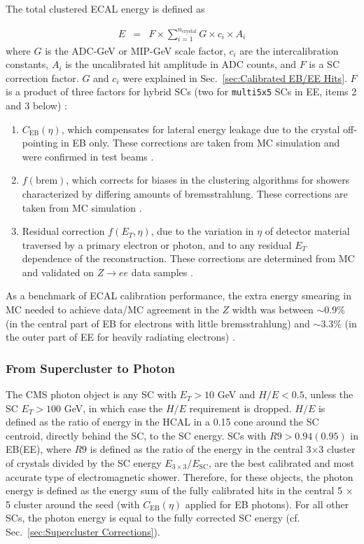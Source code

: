 \documentclass[dissertation.tex]{subfiles}
\begin{document}
The total clustered ECAL energy is defined as

\begin{eqnarray}
E &=& F \times \sum_{i=1}^{n_{\mathrm{crystal}}} G \times c_{i} \times A_{i}
\end{eqnarray}
%
where $G$ is the ADC-GeV or MIP-GeV scale factor, $c_{i}$ are the intercalibration constants, $A_{i}$ is the uncalibrated hit amplitude in ADC counts, and $F$ is a SC correction factor.  $G$ and $c_{i}$ were explained in Sec.~\ref{sec:Calibrated EB/EE Hits}.  $F$ is a product of three factors for hybrid SCs (two for \verb+multi5x5+ SCs in EE, items 2 and 3 below) \cite{ECAL_SC_note}:

\begin{enumerate}
  \item $C_{\mathrm{EB}}(\eta)$, which compensates for lateral energy leakage due to the crystal off-pointing in EB only.  These corrections are taken from MC simulation \cite{ECAL_SC_note} and were confirmed in test beams \cite{1748-0221-3-10-P10007}.
  \item $f(\mbox{brem})$, which corrects for biases in the clustering algorithms for showers characterized by differing amounts of bremsstrahlung.  These corrections are taken from MC simulation \cite{ECAL_SC_note}.
  \item Residual correction $f(E_{T}, \eta)$, due to the variation in $\eta$ of detector material traversed by a primary electron or photon, and to any residual $E_{T}$ dependence of the reconstruction.  These corrections are determined from MC and validated on $Z\rightarrow ee$ data samples \cite{ECALEnergyScaleCorrections_Twiki}.
\end{enumerate}

As a benchmark of ECAL calibration performance, the extra energy smearing in MC needed to achieve data/MC agreement in the $Z$ width was between $\sim$0.9\% (in the central part of EB for electrons with little bremsstrahlung) and $\sim$3.3\% (in the outer part of EE for heavily radiating electrons) \cite{Higgs_note}.

\subsubsection{From Supercluster to Photon}
\label{sec:From Supercluster to Photon}

The CMS photon object is any SC with $E_{T} > 10$ GeV and $H/E < 0.5$, unless the SC $E_{T} > 100$ GeV, in which case the $H/E$ requirement is dropped.  $H/E$ is defined as the ratio of energy in the HCAL in a 0.15 cone around the SC centroid, directly behind the SC, to the SC energy.  SCs with $R9 > 0.94(0.95)$ in EB(EE), where $R9$ is defined as the ratio of the energy in the central 3$\times$3 cluster of crystals divided by the SC energy $E_{3\times 3}/E_{\mathrm{SC}}$, are the best calibrated and most accurate type of electromagnetic shower.  Therefore, for these objects, the photon energy is defined as the energy sum of the fully calibrated hits in the central 5 $\times$ 5 cluster around the seed (with $C_{\mathrm{EB}}(\eta)$ applied for EB photons).  For all other SCs, the photon energy is equal to the fully corrected SC energy (cf. Sec.~\ref{sec:Supercluster Corrections}).
\end{document}
